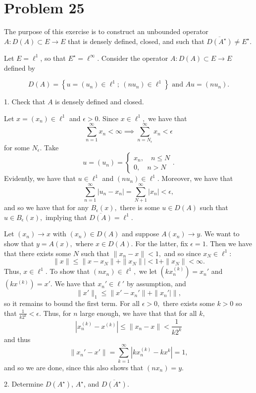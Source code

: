 \documentclass[11pt]{article}
\begin{document}
\section*{Problem 25}
\begin{problem}
    The purpose of this exercise is to construct an unbounded operator \( A : D(A) \subset E \to E \) that is densely defined, closed, and such that \( \overline{D(A^\star)} \neq E^\star \).

Let \( E = \ell^1 \), so that \( E^\star = \ell^\infty \). Consider the operator \( A : D(A) \subset E \to E \) defined by


\[
D(A) = \left\{ u = (u_n) \in \ell^1; \ (nu_n) \in \ell^1 \right\} \text{ and } Au = (nu_n).
\]



1. Check that \( A \) is densely defined and closed.
\begin{solution}
    Let $x = (x_n)\in \ell^1$ and $\epsilon>0.$ Since $x\in \ell^1,$ we have that 
    \[\sum_{n=1}^\infty x_n < \infty \implies \sum_{n = N_\epsilon}^\infty x_n < \epsilon\] for some $N_\epsilon.$ Take 
    \[u = (u_n) = \begin{cases}
        x_n, \quad n \leq N\\
        0, \quad n > N
    \end{cases}.\] Evidently, we have that $u \in \ell^1$ and $(nu_n)\in \ell^1.$ Moreover, we have that 
    \[\sum_{n=1}^\infty |u_n - x_n| = \sum_{N+1}^\infty |x_n|< \epsilon,\] and so we have that for any $B_\epsilon(x),$ there is some $u \in D(A)$ such that $u \in B_\epsilon(x),$ implying that $\overline{D(A)} = \ell^1.$

    Let $(x_n) \to x$ with $(x_n)\in D(A)$ and suppose $A(x_n) \to y.$ We want to show that $y = A(x),$ where $x\in D(A).$ For the latter, fix $\epsilon = 1.$ Then we have that there exists some $N$ such that $\|x_n - x\|< 1,$ and so since $x_N \in \ell^1:$
    \[\|x\| \leq \|x - x_N\| + \|x_N\|| < 1 + \|x_N\| < \infty.\] Thus, $x\in \ell^1.$ To show that $(nx_n)\in \ell^1,$ we let $(kx_n^{(k)})  = x_n'$ and $(kx^{(k)}) = x'.$ We have that $x_n' \in \ell'$ by assumption, and 
    \[\|x'\|_1 \leq \|x' - x_n'\| + \|x_n'|\|,\] so it remains to bound the first term. For all $\epsilon>0,$ there exists some $k>0$ so that $\frac{1}{k2^k}< \epsilon.$ Thus, for $n$ large enough, we have that that for all $k,$ \[|x_n^{(k)} - x^{(k)}| \leq \|x_n - x\|< \frac{1}{k2^k}\] and thus 
    \[\|x_n' - x'\| = \sum_{k=1}^\infty |kx_n^{(k)} - kx^{k}| = 1,\] and so we are done, since this also shows that $(nx_n) = y.$
\end{solution}
2. Determine \( D(A^\star) \), \( A^\star \), and \( \overline{D(A^\star)} \).
\end{problem}
\end{document}
